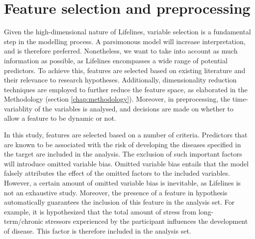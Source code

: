 \section{Feature selection and preprocessing}
\label
{section:data:feature_selection_and_preprocessing}
Given the high-dimensional nature of Lifelines, variable selection is a fundamental step in the modelling process. A parsimonous model will increase interpretation, and is therefore preferred. Nonetheless, we want to take into account as much information as possible, as Lifelines encompasses a wide range of potential predictors. To achieve this, features are selected based on existing literature and their relevance to research hypotheses. Additionally, dimensionality reduction techniques are employed to further reduce the feature space, as elaborated in the Methodology (section \ref{chap:methodology}). Moreover, in preprocessing, the time-variablity of the variables is analysed, and decisions are made on whether to allow a feature to be dynamic or not. 

In this study, features are selected based on a number of criteria. Predictors that are known to be associated with the risk of developing the diseases specified in the target are included in the analysis. The exclusion of such important factors will introduce omitted variable bias. Omitted variable bias entails that the model falsely attributes the effect of the omitted factors to the included variables. However, a certain amount of omitted variable bias is inevitable, as Lifelines is not an exhaustive study. Moreover, the presence of a feature in hypothesis automatically guarantees the inclusion of this feature in the analysis set. For example, it is hypothesized that the total amount of stress from long-term/chronic stressors experienced by the participant influences the development of disease. This factor is therefore included in the analysis set. 

